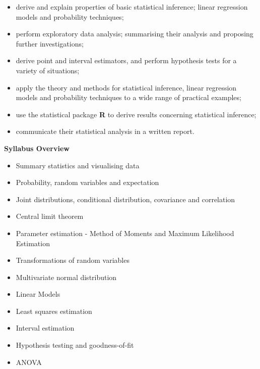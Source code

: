 \documentclass[
]{book}
\providecommand{\tightlist}{%
  \setlength{\itemsep}{0pt}\setlength{\parskip}{0pt}}
\begin{document}
\begin{itemize}
\tightlist
\item
  derive and explain properties of basic statistical inference; linear regression models and probability techniques;\\
\item
  perform exploratory data analysis; summarising their analysis and proposing further investigations;\\
\item
  derive point and interval estimators, and perform hypothesis tests for a variety of situations;\\
\item
  apply the theory and methods for statistical inference, linear regression models and probability techniques to a wide range of practical examples;\\
\item
  use the statistical package \textbf{R} to derive results concerning statistical inference;\\
\item
  communicate their statistical analysis in a written report.
\end{itemize}

\textbf{Syllabus Overview}

\begin{itemize}
\tightlist
\item
  Summary statistics and visualising data\\
\item
  Probability, random variables and expectation\\
\item
  Joint distributions, conditional distribution, covariance and correlation\\
\item
  Central limit theorem\\
\item
  Parameter estimation - Method of Moments and Maximum Likelihood Estimation\\
\item
  Transformations of random variables\\
\item
  Multivariate normal distribution\\
\item
  Linear Models\\
\item
  Least squares estimation\\
\item
  Interval estimation\\
\item
  Hypothesis testing and goodness-of-fit\\
\item
  ANOVA
\end{itemize}
\end{document}

